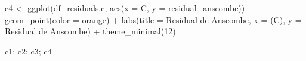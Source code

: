 \documentclass[
  letterpaper,
  DIV=11,
  numbers=noendperiod]{scrartcl}
\newenvironment{Shaded}{\begin{snugshade}}{\end{snugshade}}
\newcommand{\AttributeTok}[1]{\textcolor[rgb]{0.40,0.45,0.13}{#1}}
\newcommand{\DecValTok}[1]{\textcolor[rgb]{0.68,0.00,0.00}{#1}}
\newcommand{\FunctionTok}[1]{\textcolor[rgb]{0.28,0.35,0.67}{#1}}
\newcommand{\NormalTok}[1]{\textcolor[rgb]{0.00,0.23,0.31}{#1}}
\newcommand{\OtherTok}[1]{\textcolor[rgb]{0.00,0.23,0.31}{#1}}
\newcommand{\SpecialCharTok}[1]{\textcolor[rgb]{0.37,0.37,0.37}{#1}}
\newcommand{\StringTok}[1]{\textcolor[rgb]{0.13,0.47,0.30}{#1}}
\begin{document}
\begin{Shaded}
\begin{Highlighting}[]
\NormalTok{c4 }\OtherTok{\textless{}{-}} \FunctionTok{ggplot}\NormalTok{(df\_residuals.c, }\FunctionTok{aes}\NormalTok{(}\AttributeTok{x =}\NormalTok{ C, }\AttributeTok{y =}\NormalTok{ residual\_anscombe)) }\SpecialCharTok{+}
    \FunctionTok{geom\_point}\NormalTok{(}\AttributeTok{color =} \StringTok{\textquotesingle{}orange\textquotesingle{}}\NormalTok{) }\SpecialCharTok{+}
    \FunctionTok{labs}\NormalTok{(}\AttributeTok{title =} \StringTok{\textquotesingle{}Residual de Anscombe\textquotesingle{}}\NormalTok{, }\AttributeTok{x =} \StringTok{\textquotesingle{}(C)\textquotesingle{}}\NormalTok{, }\AttributeTok{y =} \StringTok{\textquotesingle{}Residual de Anscombe\textquotesingle{}}\NormalTok{) }\SpecialCharTok{+}
    \FunctionTok{theme\_minimal}\NormalTok{(}\DecValTok{12}\NormalTok{)}
\end{Highlighting}
\end{Shaded}

\begin{Shaded}
\begin{Highlighting}[]
\NormalTok{c1; c2; c3; c4}
\end{Highlighting}
\end{Shaded}
\end{document}
